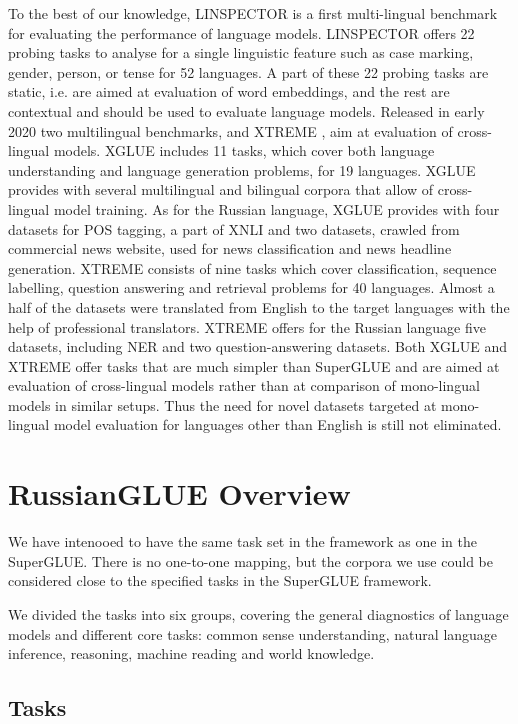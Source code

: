 \documentclass[11pt,a4paper]{article}
\begin{document}
To the best of our knowledge, LINSPECTOR \cite{eichler-etal-2019-linspector} is a first multi-lingual benchmark for evaluating the performance of language models. LINSPECTOR offers 22 probing tasks to analyse for a single linguistic feature such as case marking, gender, person, or tense for 52 languages. A part of these 22 probing tasks are static, i.e. are aimed at evaluation of word embeddings, and the rest are contextual and should be used to evaluate language models. Released in early 2020 two multilingual benchmarks, \cite{liang2020xglue} and  XTREME \cite{hu2020xtreme}, aim at evaluation of cross-lingual models.  
XGLUE includes 11 tasks, which cover both language understanding and language generation problems, for 19 languages. XGLUE provides with several multilingual and bilingual corpora that allow of cross-lingual model training. As for the Russian language, XGLUE provides with four datasets for POS tagging, a part of XNLI \cite{conneau2018xnli} and two datasets, crawled from commercial news website, used for news classification and news headline generation.  XTREME consists of nine tasks which cover classification, sequence labelling, question answering and retrieval problems for 40 languages. Almost a half of the datasets were translated from English to the target languages with the help of professional translators. XTREME offers for the Russian language five datasets, including NER and two question-answering datasets. Both XGLUE and XTREME offer tasks that are much simpler than SuperGLUE and are aimed at evaluation of cross-lingual models rather than at comparison of mono-lingual models in similar setups. Thus the need  for novel datasets targeted at mono-lingual model evaluation for languages other than English is still not eliminated. 

\section{RussianGLUE Overview} \label{sec:overview}
We have intenooed to have the same task set in the framework as one in the SuperGLUE. There is no one-to-one mapping, but the corpora we use could be considered close to the specified tasks in the SuperGLUE framework.

We divided the tasks into six groups, covering the general diagnostics of language models and different core tasks: common sense understanding, natural language inference, reasoning, machine reading and world knowledge.     

\subsection{Tasks} 
\label{sec:tasks}
\end{document}
